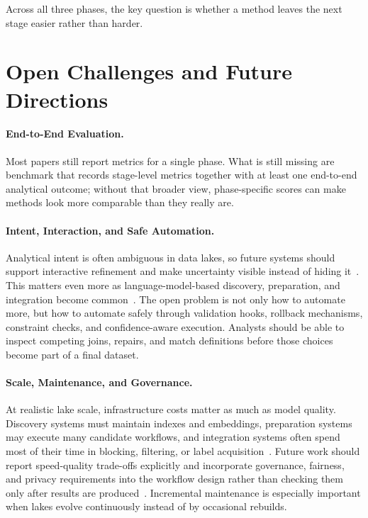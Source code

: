 \documentclass[sigconf]{acmart}
\begin{document}
Across all three phases, the key question is whether a method leaves the next stage easier rather than harder.

\section{Open Challenges and Future Directions}
\paragraph{End-to-End Evaluation.}
Most papers still report metrics for a single phase. What is still missing are benchmark that records stage-level metrics together with at least one end-to-end analytical outcome; without that broader view, phase-specific scores can make methods look more comparable than they really are.

\paragraph{Intent, Interaction, and Safe Automation.}
Analytical intent is often ambiguous in data lakes, so future systems should support interactive refinement and make uncertainty visible instead of hiding it~\cite{10.1145/3588722,10.14778/3659437.3659461}. This matters even more as language-model-based discovery, preparation, and integration become common~\cite{10.14778/3611540.3611624,10.14778/3742728.3742757}. The open problem is not only how to automate more, but how to automate safely through validation hooks, rollback mechanisms, constraint checks, and confidence-aware execution. Analysts should be able to inspect competing joins, repairs, and match definitions before those choices become part of a final dataset.

\paragraph{Scale, Maintenance, and Governance.}
At realistic lake scale, infrastructure costs matter as much as model quality. Discovery systems must maintain indexes and embeddings, preparation systems may execute many candidate workflows, and integration systems often spend most of their time in blocking, filtering, or label acquisition~\cite{10.14778/3685800.3685880,10.1145/3698831,10184692}. Future work should report speed-quality trade-offs explicitly and incorporate governance, fairness, and privacy requirements into the workflow design rather than checking them only after results are produced~\cite{10.14778/3611479.3611525}. Incremental maintenance is especially important when lakes evolve continuously instead of by occasional rebuilds.
\end{document}
